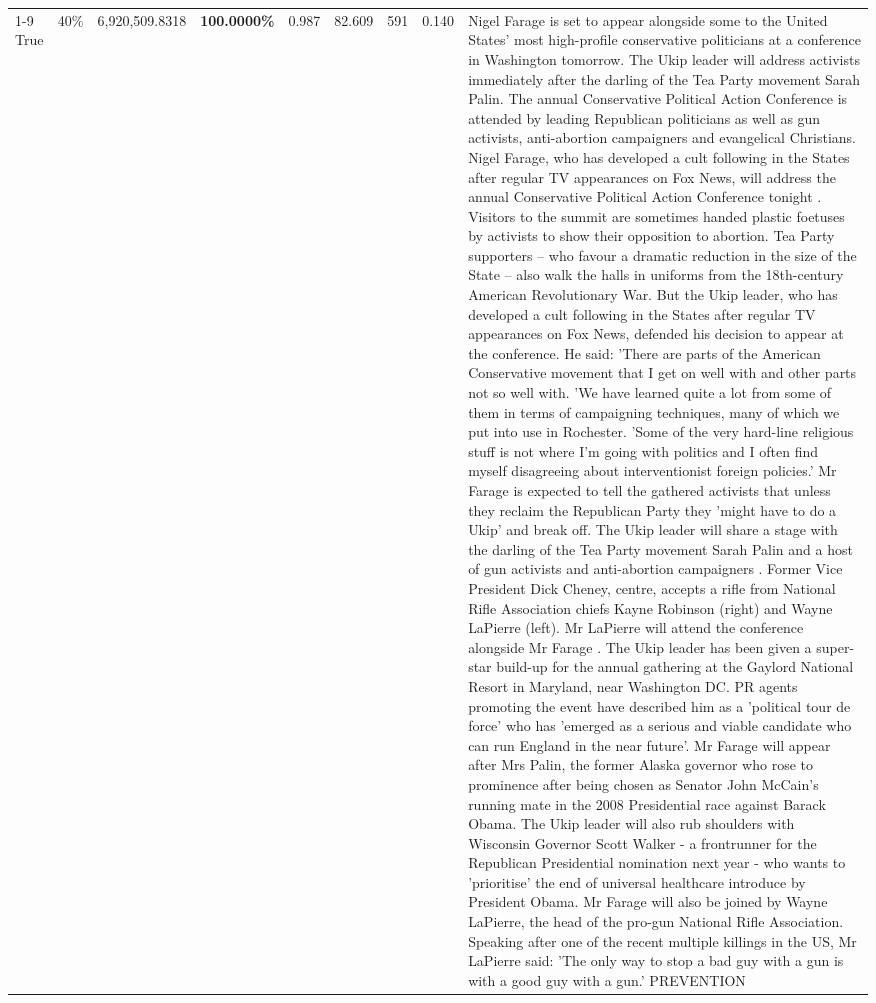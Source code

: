 \begin{table}[H]
\begin{tabular}{lllrlllll}
\cline{1-9} \cline{2-9}
True & 40\% & 6,920,509.8318 & \bfseries \color{red} 100.0000\% & 0.987 & 82.609 & 591 & 0.140 & Nigel Farage is set to appear alongside some to the United States' most high-profile conservative politicians at a conference in Washington tomorrow. The Ukip leader will address activists immediately after the darling of the Tea Party movement Sarah Palin. The annual Conservative Political Action Conference is attended by leading Republican politicians as well as gun activists, anti-abortion campaigners and evangelical Christians. Nigel Farage, who has developed a cult following in the States after regular TV appearances on Fox News, will address the annual Conservative Political Action Conference tonight . Visitors to the summit are sometimes handed plastic foetuses by activists to show their opposition to abortion. Tea Party supporters – who favour a dramatic reduction in the size of the State – also walk the halls in uniforms from the 18th-century American Revolutionary War. But the Ukip leader, who has developed a cult following in the States after regular TV appearances on Fox News, defended his decision to appear at the conference. He said: 'There are parts of the American Conservative movement that I get on well with and other parts not so well with. 'We have learned quite a lot from some of them in terms of campaigning techniques, many of which we put into use in Rochester. 'Some of the very hard-line religious stuff is not where I'm going with politics and I often find myself disagreeing about interventionist foreign policies.' Mr Farage is expected to tell the gathered activists that unless they reclaim the Republican Party they 'might have to do a Ukip' and break off. The Ukip leader will share a stage with the darling of the Tea Party movement Sarah Palin and a host of gun activists and anti-abortion campaigners . Former Vice President Dick Cheney, centre, accepts a rifle from National Rifle Association chiefs Kayne Robinson (right) and Wayne LaPierre (left). Mr LaPierre will attend the conference alongside Mr Farage . The Ukip leader has been given a super-star build-up for the annual gathering at the Gaylord National Resort in Maryland, near Washington DC. PR agents promoting the event have described him as a 'political tour de force' who has 'emerged as a serious and viable candidate who can run England in the near future'. Mr Farage will appear after Mrs Palin, the former Alaska governor who rose to prominence after being chosen as Senator John McCain's running mate in the 2008 Presidential race against Barack Obama. The Ukip leader will also rub shoulders with Wisconsin Governor Scott Walker - a frontrunner for the Republican Presidential nomination next year - who wants to 'prioritise' the end of universal healthcare introduce by President Obama. Mr Farage will also be joined by Wayne LaPierre, the head of the pro-gun National Rifle Association. Speaking after one of the recent multiple killings in the US, Mr LaPierre said: 'The only way to stop a bad guy with a gun is with a good guy with a gun.' PREVENTION \\

\end{tabular}
\end{table}
